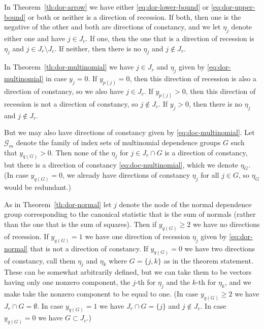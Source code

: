 In Theorem~\ref{th:dor-arrow} we have either
\eqref{eq:dor-lower-bound} or \eqref{eq:dor-upper-bound} or both or neither
is a direction of recession.  If both, then one is the negative of the
other and both are directions of constancy, and we let $\eta_j$ denote
either one and have $j \in J_c$.  If one, then the one that is a direction
of recession is $\eta_j$ and $j \in J_r \setminus J_c$.
If neither, then there is no $\eta_j$ and $j \notin J_r$.

In Theorem~\ref{th:dor-multinomial} we have $j \in J_r$ and $\eta_j$
given by \eqref{eq:dor-multinomial} in case $y_j = 0$.  If $y_{p(j)} = 0$,
then this direction of recession is also a direction of constancy, so
we also have $j \in J_c$.  If $y_{p(j)} > 0$, then this direction of
recession is not a direction of constancy, so $j \notin J_c$.  If
$y_j > 0$, then there is no $\eta_j$ and $j \notin J_r$.

But we may also have directions of constancy
given by \eqref{eq:doc-multinomial}.
Let $\mathcal{G}_m$ denote the family of index sets of multinomial dependence 
groups $G$ such that $y_{q(G)} > 0$.  Then none of the $\eta_j$
for $j \in J_r \cap G$ is a direction of constancy, but there is a direction
of constancy \eqref{eq:doc-multinomial}, which we denote $\eta_G$.
(In case $y_{q(G)} = 0$, we already have directions of constancy $\eta_j$
for all $j \in G$, so $\eta_G$ would be redundant.)

As in Theorem~\ref{th:dor-normal} let $j$ denote the node of the normal
dependence group corresponding to the canonical statistic that is the
sum of normals (rather than the one that is the sum of squares).
Then if $y_{q(G)} \ge 2$ we have no directions of recession.
If $y_{q(G)} = 1$ we have one direction of recession $\eta_j$ given
by \eqref{eq:dor-normal} that is not a direction of constancy.
If $y_{q(G)} = 0$ we have two directions of constancy, call them $\eta_j$
and $\eta_k$ where $G = \{ j, k \}$ as in the theorem statement.
These can be somewhat arbitrarily defined, but we can take them to be
vectors having only one nonzero component, the $j$-th for $\eta_j$
and the $k$-th for $\eta_k$, and we make take the nonzero component to
be equal to one.  (In case $y_{q(G)} \ge 2$ we have $J_r \cap G = \emptyset$.
In case $y_{q(G)} = 1$ we have $J_r \cap G = \{ j \}$ and $j \notin J_c$.
In case $y_{q(G)} = 0$ we have $G \subset J_c$.)

